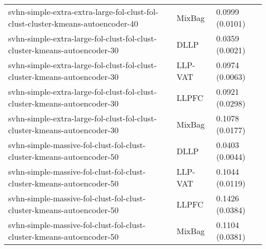 \begin{longtable}{lll}
                              svhn-simple-extra-extra-large-fol-clust-fol-clust-cluster-kmeans-autoencoder-40 &    MixBag &                       0.0999 (0.0101) \\
                                    svhn-simple-extra-large-fol-clust-fol-clust-cluster-kmeans-autoencoder-30 &      DLLP &                       0.0359 (0.0021) \\
                                    svhn-simple-extra-large-fol-clust-fol-clust-cluster-kmeans-autoencoder-30 &   LLP-VAT &                       0.0974 (0.0063) \\
                                    svhn-simple-extra-large-fol-clust-fol-clust-cluster-kmeans-autoencoder-30 &     LLPFC &                       0.0921 (0.0298) \\
                                    svhn-simple-extra-large-fol-clust-fol-clust-cluster-kmeans-autoencoder-30 &    MixBag &                       0.1078 (0.0177) \\
                                        svhn-simple-massive-fol-clust-fol-clust-cluster-kmeans-autoencoder-50 &      DLLP &                       0.0403 (0.0044) \\
                                        svhn-simple-massive-fol-clust-fol-clust-cluster-kmeans-autoencoder-50 &   LLP-VAT &                       0.1044 (0.0119) \\
                                        svhn-simple-massive-fol-clust-fol-clust-cluster-kmeans-autoencoder-50 &     LLPFC &                       0.1426 (0.0384) \\
                                        svhn-simple-massive-fol-clust-fol-clust-cluster-kmeans-autoencoder-50 &    MixBag &                       0.1104 (0.0381) \\
\end{longtable}
